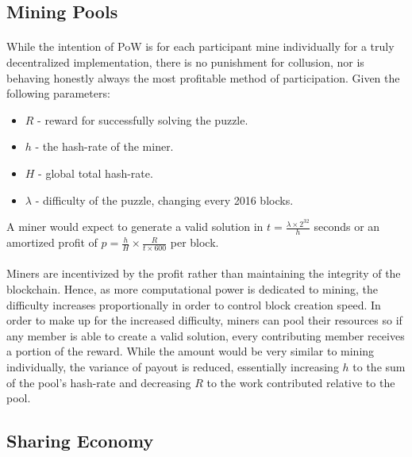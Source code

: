 
\subsection{Mining Pools}

\paragraph{} While the intention of PoW is for each participant mine individually for a truly decentralized implementation, there is no punishment for collusion, nor is behaving honestly always the most profitable method of participation. Given the following parameters:

\begin{itemize}
  \item $R$ - reward for successfully solving the puzzle.
  \item $h$ - the hash-rate of the miner.
  \item $H$ - global total hash-rate.
  \item $\lambda$ - difficulty of the puzzle, changing every 2016 blocks.
\end{itemize}

\noindent A miner would expect to generate a valid solution in $t = \frac{\lambda \times 2^{32}}{h}$ \cite{difficulty2019} seconds or an amortized profit of $p = \frac{h}{H} \times \frac{R}{t \times 600}$ per block.

\paragraph{} Miners are incentivized by the profit rather than maintaining the integrity of the blockchain. Hence, as  more computational power is dedicated to mining, the difficulty increases proportionally in order to control block creation speed. In order to make up for the increased difficulty, miners can pool their resources so if any member is able to create a valid solution, every contributing member receives a portion of the reward. While the amount would be very similar to mining individually, the variance of payout is reduced, essentially increasing $h$ to the sum of the pool's hash-rate and decreasing $R$ to the work contributed relative to the pool.

\subsection{Sharing Economy} \label{section:sharingeconomy}

